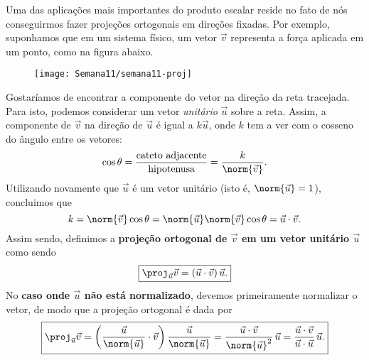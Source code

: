 Uma das aplicações mais importantes do produto escalar reside no fato de nós conseguirmos fazer projeções ortogonais em direções fixadas. Por exemplo, suponhamos que em um sistema físico, um vetor $\vec{v}$ representa a força aplicada em um ponto, como na figura abaixo.
\begin{figure}[h!]
	\begin{center}
		\texttt{[image: Semana11/semana11-proj]}
	\end{center}
\end{figure} Gostaríamos de encontrar a componente do vetor na direção da reta tracejada. Para isto, podemos considerar um vetor \textit{unitário} $\vec{u}$ sobre a reta. Assim, a componente de $\vec{v}$ na direção de $\vec{u}$ é igual a $k \vec{u}$, onde $k$ tem a ver com o cosseno do ângulo entre os vetores:
\begin{equation}
\cos \theta = \frac{\text{cateto adjacente}}{\text{hipotenusa}} = \frac{k}{\norm{\vec{v}}}.
\end{equation} Utilizando novamente que $\vec{u}$ é um vetor unitário (isto é, $\norm{\vec{u}}=1$), concluimos que
\begin{equation}
k = \norm{\vec{v}} \cos \theta = \norm{\vec{u}} \norm{\vec{v}} \cos \theta = \vec{u} \cdot \vec{v}.
\end{equation} Assim sendo, definimos a \textbf{projeção ortogonal de $\vec{v}$ em um vetor unitário $\vec{u}$} como sendo
\begin{equation}
\boxed{\proj_{\vec{u}} \vec{v} = (\vec{u} \cdot \vec{v}) \, \vec{u}.}
\end{equation} No \textbf{caso onde $\vec{u}$ não está normalizado}, devemos primeiramente normalizar o vetor, de modo que a projeção ortogonal é dada por
\begin{equation}
\boxed{\proj_{\vec{u}} \vec{v} = \bigg( \frac{\vec{u}}{\norm{\vec{u}}} \cdot \vec{v} \bigg) \, \frac{\vec{u}}{\norm{\vec{u}}} = \frac{\vec{u} \cdot \vec{v}}{\norm{\vec{u}}^2} \, \vec{u} = \frac{\vec{u} \cdot \vec{v}}{\vec{u} \cdot \vec{u}} \, \vec{u}.}
\end{equation}

